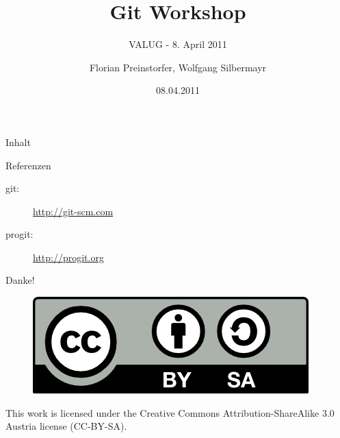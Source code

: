 \documentclass[%
]{beamer}
\title{Git Workshop}
\subtitle{VALUG - 8. April 2011}
\author[Florian Preinstorfer, Wolfgang Silbermayr]{Florian Preinstorfer, Wolfgang Silbermayr}
\date[valug - 08.04.2011]{08.04.2011}
\begin{document}
\frame[plain]{\titlepage}

\begin{frame}{Inhalt}
  \tableofcontents[pausesections]
\end{frame}




\begin{frame}{Referenzen}
\begin{description}
  \item[git:] \url{http://git-scm.com}
  \item[progit:] \url{http://progit.org}
\end{description}
\end{frame}

\begin{frame}[plain]
  \begin{center}
    \vspace{1cm}
    Danke!
    \vspace{3cm}
    \begin{figure}[!b]
      \includegraphics[scale=0.5]{img/by-sa}
    \end{figure}
    \tiny{This work is licensed under the Creative Commons Attribution-ShareAlike 3.0 Austria license (CC-BY-SA).}
\end{center}
\end{frame}
\end{document}
